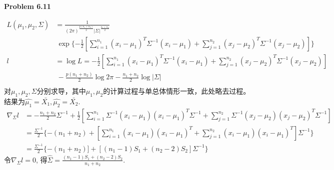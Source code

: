 \documentclass[UTF8,12pt]{article}
\newenvironment{problem}[2][Problem]
{ \begin{mdframed}[backgroundcolor=gray!20] \textbf{#1 #2}}
	{  \end{mdframed}}
\newenvironment{answer}
{%
}
{}
\newenvironment{eq}
{
	\begin{equation}
		\begin{aligned}\nonumber
}
{
		\end{aligned}
	\end{equation}
}
\begin{document}
\begin{problem}{6.11}
\end{problem}
\begin{answer}
	\begin{eq}
		L(\mu_1,\mu_2,\Sigma)&=\frac{1}{(2\pi)^{\frac{p(n_1+n_2)}{2}} 
		|\Sigma|^{\frac{n_1+n_2}{2}}}\\
		&\ \exp{\{-\frac{1}{2} [\sum_{i=1}^{n_1}
		(x_i-\mu_1)^T \Sigma^{-1}(x_i-\mu_1) + \sum_{j=1}^{n_2} 
		(x_j-\mu_2)^T \Sigma^{-1}(x_j-\mu_2)]\}}\\
		l &=\log{L} = -\frac{1}{2} [\sum_{i=1}^{n_1}
		(x_i-\mu_1)^T \Sigma^{-1}(x_i-\mu_1) + \sum_{j=1}^{n_2} 
		(x_j-\mu_2)^T \Sigma^{-1}(x_j-\mu_2)]\\
		&\ - \frac{p(n_1+n_2)}{2} \log{2\pi} - \frac{n_1+n_2}{2}\log{|\Sigma|}\\
	\end{eq}
	对$\mu_1,\mu_2,\Sigma$分别求导，其中$\mu_1,\mu_2$的计算过程与单总体情形一致，此处略去过程。
	结果为$\hat{\mu_1}=\bar{X_1},\hat{\mu_2}=\bar{X_2}$.
	\begin{eq}
		\nabla_\Sigma l &=-\frac{n_1+n_2}{2}\Sigma^{-1}+\frac{1}{2}[
		\sum_{i=1}^{n_1} \Sigma^{-1} (x_i-\mu_1)(x_i-\mu_1)^T\Sigma^{-1} +
		\sum_{j=1}^{n_2} \Sigma^{-1} (x_j-\mu_2)(x_j-\mu_2)^T\Sigma^{-1}]\\
		&= \frac{\Sigma^{-1}}{2} \{-(n_1+n_2) + 
		[\sum_{i=1}^{n_1}(x_i-\mu_1)(x_i-\mu_1)^T +
		\sum_{j=1}^{n_2}(x_i-\mu_1)(x_i-\mu_1)^T]\Sigma^{-1}\}\\
		&= \frac{\Sigma^{-1}}{2} \{-(n_1+n_2)] + [(n_1-1)S_1+(n_2-2)S_2]\Sigma^{-1}\}
	\end{eq}
	令$\nabla_\Sigma l = 0$, 得$\hat{\Sigma}=\frac{(n_1-1)S_1+(n_2-2)S_2}{n_1+n_2}$. 
\end{answer}
\end{document}
